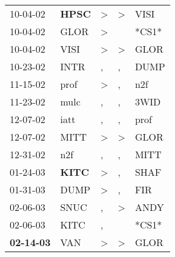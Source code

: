 \begin{supertabular}{p{0.07\textwidth}p{0.06\textwidth}p{0.02\textwidth}p{0.02\textwidth}p{0.06\textwidth}}
          10-04-02\textsuperscript{} &  \textbf{HPSC\textsuperscript{}} &     \textgreater &     \textgreater &           VISI\textsuperscript{} \\
          10-04-02\textsuperscript{} &           GLOR\textsuperscript{} &     \textgreater &                  &                            *CS1* \\
          10-04-02\textsuperscript{} &           VISI\textsuperscript{} &     \textgreater &     \textgreater &           GLOR\textsuperscript{} \\
          10-23-02\textsuperscript{} &           INTR\textsuperscript{} &                , &                , &           DUMP\textsuperscript{} \\
          11-15-02\textsuperscript{} &           prof\textsuperscript{} &     \textgreater &                , &            n2f\textsuperscript{} \\
          11-23-02\textsuperscript{} &           mulc\textsuperscript{} &                , &                , &           3WID\textsuperscript{} \\
          12-07-02\textsuperscript{} &           iatt\textsuperscript{} &                , &                , &           prof\textsuperscript{} \\
          12-07-02\textsuperscript{} &           MITT\textsuperscript{} &     \textgreater &     \textgreater &           GLOR\textsuperscript{} \\
          12-31-02\textsuperscript{} &            n2f\textsuperscript{} &                , &                , &           MITT\textsuperscript{} \\
          01-24-03\textsuperscript{} &  \textbf{KITC\textsuperscript{}} &     \textgreater &                , &           SHAF\textsuperscript{} \\
          01-31-03\textsuperscript{} &           DUMP\textsuperscript{} &     \textgreater &                , &            FIR\textsuperscript{} \\
          02-06-03\textsuperscript{} &           SNUC\textsuperscript{} &                , &     \textgreater &           ANDY\textsuperscript{} \\
          02-06-03\textsuperscript{} &           KITC\textsuperscript{} &                , &                  &                            *CS1* \\
 \textbf{02-14-03\textsuperscript{}} &            VAN\textsuperscript{} &     \textgreater &     \textgreater &           GLOR\textsuperscript{} \\

\end{supertabular}
